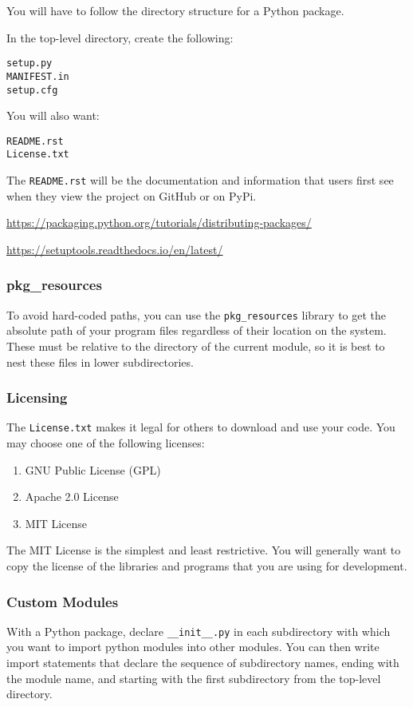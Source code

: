 \documentclass{article}
\begin{document}
You will have to follow the directory structure for a
Python package.

In the top-level directory, create the following:
\begin{verbatim}
setup.py
MANIFEST.in
setup.cfg
\end{verbatim}
You will also want:
\begin{verbatim}
README.rst
License.txt
\end{verbatim}
The \texttt{README.rst} will be the documentation and information
that users first see when they view the project on GitHub 
or on PyPi.

\url{https://packaging.python.org/tutorials/distributing-packages/}

\url{https://setuptools.readthedocs.io/en/latest/}

\subsubsection{pkg\_resources}

To avoid hard-coded paths, you can use the \texttt{pkg\_resources} library
to get the absolute path of your program files regardless of their 
location on the system. These must be relative to the directory
of the current module, so it is best to nest these files in lower
subdirectories.


\subsubsection{Licensing}

The \texttt{License.txt} makes it legal for others to download 
and use your code. You may choose one of the following
licenses:

\begin{enumerate}
\item GNU Public License (GPL)
\item Apache 2.0 License
\item MIT License
\end{enumerate}

The MIT License is the simplest and least restrictive.
You will generally want to copy the license of the 
libraries and programs that you are using for development.

\subsubsection{Custom Modules}

With a Python package, declare \texttt{\_\_init\_\_.py} in each subdirectory with which 
you want to import python modules into other modules. You can then write import 
statements that declare the sequence of subdirectory names, 
ending with the module name, and starting with the first subdirectory from 
the top-level directory.
\end{document}
